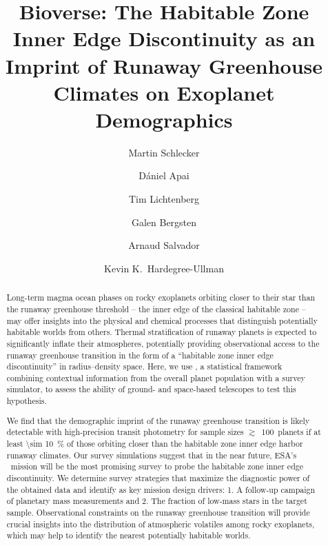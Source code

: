 \documentclass[twocolumn,twocolappendix,linenumbers]{aastex631}
\begin{document}
\title{Bioverse: The Habitable Zone Inner Edge Discontinuity as an Imprint of Runaway Greenhouse Climates on Exoplanet Demographics}

\author[0000-0001-8355-2107]{Martin Schlecker}
\author[0000-0003-3714-5855]{D\'{a}niel Apai}
\author[0000-0002-3286-7683]{Tim Lichtenberg}
\author[0000-0003-4500-8850]{Galen Bergsten}
\author[0000-0001-8106-6164]{Arnaud Salvador}
\author[0000-0003-3702-0382]{Kevin K.\ Hardegree-Ullman}


\begin{abstract}
Long-term magma ocean phases on rocky exoplanets orbiting closer to their star than the runaway greenhouse threshold -- the inner edge of the classical habitable zone -- may offer insights into the physical and chemical processes that distinguish potentially habitable worlds from others.
Thermal stratification of runaway planets is expected to significantly inflate their atmospheres, potentially providing observational access to the runaway greenhouse transition in the form of a ``habitable zone inner edge discontinuity'' in radius--density space.
Here, we use \bioverse, a statistical framework combining contextual information from the overall planet population with a survey simulator, to assess the ability of ground- and space-based telescopes to test this hypothesis.

We find that the demographic imprint of the runaway greenhouse transition is likely detectable with high-precision transit photometry for sample sizes $\gtrsim$~100~planets if at least \SI{\sim 10}{\percent} of those orbiting closer than the habitable zone inner edge harbor runaway climates.
Our survey simulations suggest that in the near future, ESA's \plato\ mission will be the most promising survey to probe the habitable zone inner edge discontinuity.
We determine survey strategies that maximize the diagnostic power of the obtained data and identify as key mission design drivers: 1. A follow-up campaign of planetary mass measurements and 2. The fraction of low-mass stars in the target sample.
Observational constraints on the runaway greenhouse transition will provide crucial insights into the distribution of atmospheric volatiles among rocky exoplanets, which may help to identify the nearest potentially habitable worlds.
\end{abstract}
\end{document}
